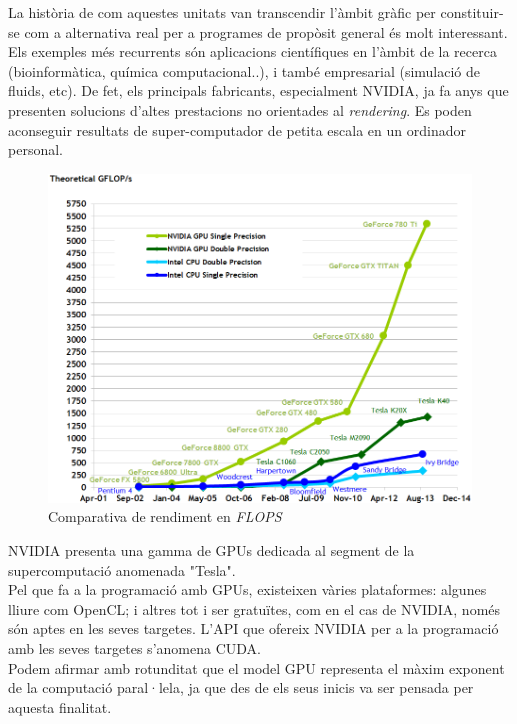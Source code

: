 \documentclass[11pt,a4paper]{article}
\begin{document}
La història de com aquestes unitats van transcendir l'àmbit gràfic per constituir-se com a alternativa real per a programes de propòsit general  és molt interessant. Els exemples més recurrents són aplicacions científiques en l'àmbit de la recerca (bioinformàtica, química computacional..), i també empresarial (simulació de fluids, etc)\cite{CUDAapplications}. De fet, els principals fabricants, especialment NVIDIA, ja fa anys que presenten solucions d'altes prestacions no orientades al \textit{rendering}.  Es poden aconseguir resultats de super-computador de petita escala en un ordinador personal.
\\

\begin{figure}[hbtp]
\centering
\includegraphics[width=12cm]{resources/floating-point-operations-per-second.png}
\caption{Comparativa de rendiment en \textit{FLOPS}}
\end{figure}

NVIDIA presenta una gamma de GPUs dedicada al segment de la supercomputació anomenada "Tesla"\cite{tesla}.
\\

Pel que fa a la programació amb GPUs, existeixen vàries plataformes: algunes lliure com OpenCL\cite{opencl}; i altres tot i ser gratuïtes, com en el cas de NVIDIA, només són aptes en les seves targetes. L'API que ofereix NVIDIA per a la programació amb les seves targetes s'anomena CUDA\cite{cuda}.
\\

Podem afirmar amb rotunditat que el model GPU representa el màxim exponent de la computació paral·lela, ja que des de els seus inicis va ser pensada per aquesta finalitat.
\\
\end{document}
